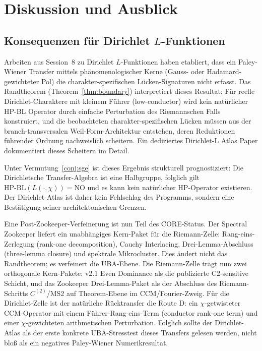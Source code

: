 \documentclass[11pt]{article}
\theoremstyle{definition}
\theoremstyle{remark}
\newcommand{\HBL}{\mathrm{HP\text{-}BL}}
\begin{document}
\section{Diskussion und Ausblick}
\label{sec:outlook}

\subsection{Konsequenzen für Dirichlet \texorpdfstring{$L$}{L}-Funktionen}

Arbeiten aus Session~8 zu Dirichlet $L$-Funktionen \cite{PaleyWienerDirichlet}
haben etabliert, dass ein Paley-Wiener Transfer mittels phänomenologischer Kerne
(Gauss- oder Hadamard-gewichteter Pol) die
charakter-spezifischen Lücken-Signaturen nicht erfasst. Das Randtheorem
(Theorem~\ref{thm:boundary}) interpretiert dieses Resultat: Für reelle Dirichlet-Charaktere
mit kleinem Führer (low-conductor) wird kein natürlicher HP-BL Operator
durch einfache Perturbation des Riemannschen Falls konstruiert, und die beobachteten
charakter-spezifischen Lücken müssen aus der branch-transversalen
Weil-Form-Architektur entstehen, deren Reduktionen führender Ordnung nachweislich
scheitern. Ein dediziertes Dirichlet-L Atlas Paper
\cite{DirichletAtlas} dokumentiert dieses Scheitern im Detail.

Unter Vermutung~\ref{conj:sge} ist dieses Ergebnis strukturell
prognostiziert: Die Dirichletsche Transfer-Algebra ist eine Halbgruppe, folglich
gilt $\HBL(L(\cdot, \chi)) = \mathrm{NO}$ und es kann kein natürlicher HP-Operator
existieren. Der Dirichlet-Atlas ist daher kein Fehlschlag des
Programms, sondern eine Bestätigung seiner architektonischen Grenzen.

Eine Post-Zookeeper-Verfeinerung ist nun Teil des CORE-Status. Der
Spectral Zookeeper \cite{Zookeeper2026} liefert ein unabhängiges Kern-Paket
für die Riemann-Zelle: Rang-eins-Zerlegung (rank-one decomposition), Cauchy
Interlacing, Drei-Lemma-Abschluss (three-lemma closure) und spektrale Mikrocluster. Dies
ändert nicht das Randtheorem; es verfeinert die UBA-Ebene. Die
Riemann-Zelle trägt nun zwei orthogonale Kern-Pakete: v2.1 Even
Dominance als die publizierte C2-sensitive Schicht, und das Zookeeper
Drei-Lemma-Paket als der Abschluss des Riemann-Schritts $C^{(2)}$/MS2
auf Theorem-Ebene im CCM/Fourier-Zweig. Für die Dirichlet-Zelle
ist der natürliche Rücktransfer die Route D:
ein $\chi$-getwisteter CCM-Operator mit einem Führer-Rang-eins-Term (conductor rank-one term) und einer
$\chi$-gewichteten arithmetischen Perturbation. Folglich sollte der Dirichlet-Atlas
als der erste konkrete UBA-Stresstest dieses Transfers gelesen werden,
nicht bloß als ein negatives Paley-Wiener Numerikresultat.
\end{document}
